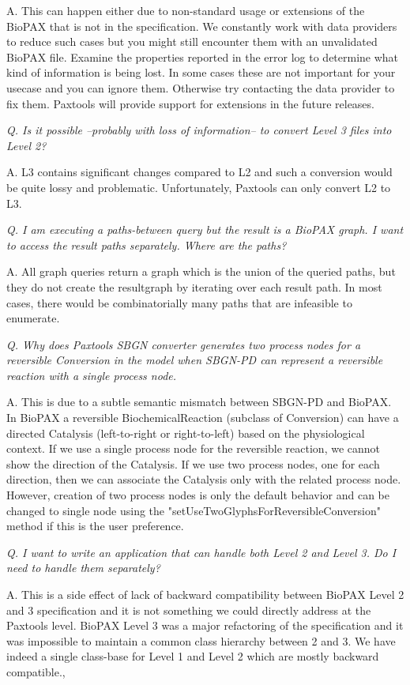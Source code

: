 \documentclass{tufte-book}
\begin{document}
A. This can happen either  due to non-standard usage or extensions of the BioPAX that is not in the specification. We constantly work with data providers to reduce such cases but you might still encounter them with an unvalidated BioPAX file. Examine the properties reported in the error log to determine what kind of information is being lost. In some cases these are not important for your usecase and you can ignore them. Otherwise try contacting the data provider to fix them.  Paxtools will provide support for extensions in the future releases.

\textit{Q. Is it possible --probably with loss of information-- to convert Level 3 files into Level 2?}
 
A. L3 contains significant changes compared to L2 and such a conversion would be quite lossy and problematic. Unfortunately, Paxtools can only convert L2 to L3.

\textit{Q. I am executing a paths-between query but the result is a BioPAX graph. I want to access the result paths separately. Where are the paths?}

A. All graph queries  return a graph which is the union of the queried paths, but they do not create the resultgraph by iterating over each result path. In most cases, there would be combinatorially many paths that are infeasible to enumerate.

\textit{Q. Why does Paxtools SBGN converter generates two process nodes for a reversible Conversion in the model when SBGN-PD can represent a reversible reaction with a single process node.}

A. This is due to a subtle semantic mismatch between SBGN-PD and BioPAX. In BioPAX a reversible BiochemicalReaction (subclass of Conversion) can have a directed Catalysis (left-to-right or right-to-left) based on the physiological context. If we use a single process node for the reversible reaction, we cannot show the direction of the Catalysis. If we use two process nodes, one for each direction, then we can associate the Catalysis only with the related process node. However, creation of two process nodes is only the default behavior and can be changed to single node using the "setUseTwoGlyphsForReversibleConversion" method if this is the user preference.

\textit{Q. I want to write an application that can handle both Level 2 and Level 3. Do I need to handle them separately?} 

A. This is a side effect of lack of backward compatibility between BioPAX Level 2 and 3 specification and it is not something we could directly address at the Paxtools level. BioPAX Level 3 was a major refactoring of the specification and it was impossible to maintain a common class hierarchy between 2 and 3. We have indeed a single class-base for Level 1 and Level 2 which are mostly backward compatible.,
\end{document}
